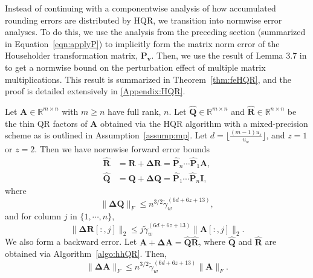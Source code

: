 \documentclass[review,onefignum,onetabnum]{siamart190516}
\newcommand{\R}{\mathbb{R}}
\newcommand{\bb}[1]{\mathbf{#1}}
\begin{document}
Instead of continuing with a componentwise analysis of how accumulated rounding errors are distributed by HQR, we transition into normwise error analyses.
To do this, we use the analysis from the preceding section (summarized in Equation~\ref{eqn:applyP}) to implicitly form the matrix norm error of the Householder transformation matrix, $\bb{P_v}$.
Then, we use the result of Lemma 3.7 in \cite{Higham2002} to get a normwise bound on the perturbation effect of multiple matrix multiplications.
This result is summarized in Theorem~\ref{thm:feHQR}, and the proof is detailed extensively in \ref{Appendix:HQR}.

\begin{theorem}
	\label{thm:feHQR}
	Let $\bb{A}\in\R^{m\times n}$ with $m\geq n$ have full rank, $n$. 
	Let $\hat{\bb{Q}}\in\R^{m\times n}$ and $\hat{\bb{R}}\in\R^{n\times n}$ be the thin QR factors of $\bb{A}$ obtained via the HQR algorithm with a mixed-precision scheme as is outlined in Assumption~\ref{assump:mp}.
	Let $d=\lfloor\frac{(m-1) u_s}{u_w}\rfloor$, and $z=1$ or $z=2$. 
	Then we have normwise forward error bounds
	\begin{align}
	\hat{\bb{R}} &= \bb{R} + \bb{\Delta R} = \hat{\bb{P}}_n\cdots\hat{\bb{P}}_1 \bb{A},\\
	\hat{\bb{Q}} &= \bb{Q} + \bb{\Delta Q} = \hat{\bb{P}}_1\cdots\hat{\bb{P}}_n \bb{I},
	\end{align}
	where
	\begin{equation}
	  \|\bb{\Delta Q}\|_F \leq n^{3/2} \tilde{\gamma}_w^{(6d+6z+13)},
	\end{equation}
	and for column $j$ in $\{1, \cdots, n\}$,
	\begin{equation}
	\|\bb{\Delta R}[:,j]\|_2 \leq j\tilde{\gamma}_w^{(6d+6z+13)}\|\bb{A}[:,j]\|_2.
	\end{equation}
	We also form a backward error.
	Let $\bb{A}+\bb{\Delta A} = \hat{\bb{Q}}\hat{\bb{R}}$, where $\hat{\bb{Q}}$ and $\hat{\bb{R}}$ are obtained via Algorithm~\ref{algo:hhQR}.
	Then,
	\begin{equation}
	\|\bb{\Delta A}\|_F \leq n^{3/2}\tilde{\gamma}_w^{(6d+6z+13)}\|\bb{A}\|_F.
	\end{equation}
\end{theorem}
\end{document}
